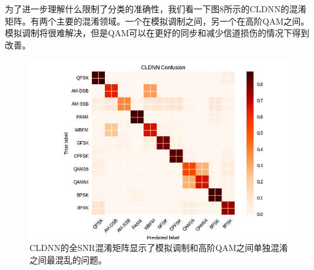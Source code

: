 为了进一步理解什么限制了分类的准确性，我们看一下图8所示的CLDNN的混淆矩阵。有两个主要的混淆领域。一个在模拟调制之间，另一个在高阶QAM之间。模拟调制将很难解决，但是QAM可以在更好的同步和减少信道损伤的情况下得到改善。\par

\begin{figure}[!h]
	\centering
	\includegraphics[scale=1]{figures/chapter_5/fig8}
	\caption{CLDNN的全SNR混淆矩阵显示了模拟调制和高阶QAM之间单独混淆之间最混乱的问题。}
\end{figure}

